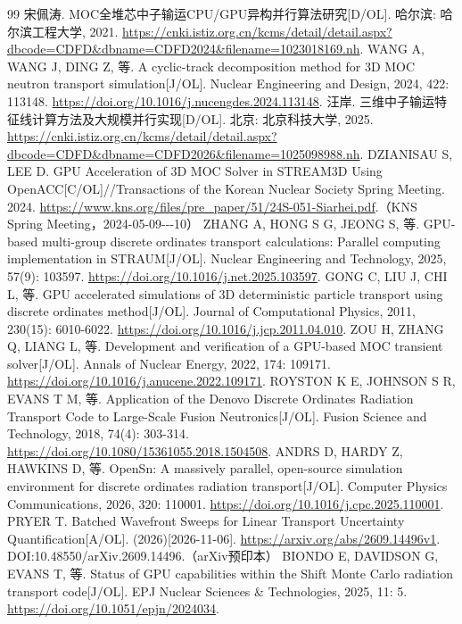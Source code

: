 \documentclass[UTF8, zihao=-4, fontset=none, a4paper]{ctexart}
\begin{document}
\begin{thebibliography}{99}
 宋佩涛. MOC全堆芯中子输运CPU/GPU异构并行算法研究{[}D/OL{]}. 哈尔滨: 哈尔滨工程大学, 2021. \url{https://cnki.istiz.org.cn/kcms/detail/detail.aspx?dbcode=CDFD&dbname=CDFD2024&filename=1023018169.nh}.
 WANG A, WANG J, DING Z, 等. A cyclic-track decomposition method for 3D MOC neutron transport simulation{[}J/OL{]}. Nuclear Engineering and Design, 2024, 422: 113148. \url{https://doi.org/10.1016/j.nucengdes.2024.113148}.
 汪岸. 三维中子输运特征线计算方法及大规模并行实现{[}D/OL{]}. 北京: 北京科技大学, 2025. \url{https://cnki.istiz.org.cn/kcms/detail/detail.aspx?dbcode=CDFD&dbname=CDFD2026&filename=1025098988.nh}.
 DZIANISAU S, LEE D. GPU Acceleration of 3D MOC Solver in STREAM3D Using OpenACC{[}C/OL{]}//Transactions of the Korean Nuclear Society Spring Meeting. 2024. \url{https://www.kns.org/files/pre_paper/51/24S-051-Siarhei.pdf}.（KNS Spring Meeting，2024-05-09-\/-\/-10）
 ZHANG A, HONG S G, JEONG S, 等. GPU-based multi-group discrete ordinates transport calculations: Parallel computing implementation in STRAUM{[}J/OL{]}. Nuclear Engineering and Technology, 2025, 57(9): 103597. \url{https://doi.org/10.1016/j.net.2025.103597}.
 GONG C, LIU J, CHI L, 等. GPU accelerated simulations of 3D deterministic particle transport using discrete ordinates method{[}J/OL{]}. Journal of Computational Physics, 2011, 230(15): 6010-6022. \url{https://doi.org/10.1016/j.jcp.2011.04.010}.
 ZOU H, ZHANG Q, LIANG L, 等. Development and verification of a GPU-based MOC transient solver{[}J/OL{]}. Annals of Nuclear Energy, 2022, 174: 109171. \url{https://doi.org/10.1016/j.anucene.2022.109171}.
 ROYSTON K E, JOHNSON S R, EVANS T M, 等. Application of the Denovo Discrete Ordinates Radiation Transport Code to Large-Scale Fusion Neutronics{[}J/OL{]}. Fusion Science and Technology, 2018, 74(4): 303-314. \url{https://doi.org/10.1080/15361055.2018.1504508}.
 ANDRS D, HARDY Z, HAWKINS D, 等. OpenSn: A massively parallel, open-source simulation environment for discrete ordinates radiation transport{[}J/OL{]}. Computer Physics Communications, 2026, 320: 110001. \url{https://doi.org/10.1016/j.cpc.2025.110001}.
 PRYER T. Batched Wavefront Sweeps for Linear Transport Uncertainty Quantification{[}A/OL{]}. (2026)[2026-11-06]. \url{https://arxiv.org/abs/2609.14496v1}. DOI:10.48550/arXiv.2609.14496.（arXiv预印本）
 BIONDO E, DAVIDSON G, EVANS T, 等. Status of GPU capabilities within the Shift Monte Carlo radiation transport code{[}J/OL{]}. EPJ Nuclear Sciences \& Technologies, 2025, 11: 5. \url{https://doi.org/10.1051/epjn/2024034}.

\end{thebibliography}
\end{document}
